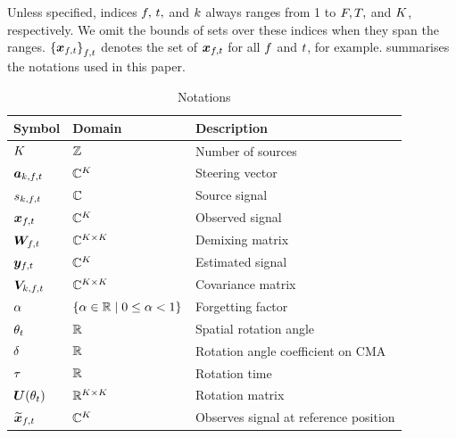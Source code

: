 \documentclass[sip,biber]{now-journal}
\begin{document}
Unless specified, indices $f,\, t,$ and $k$ always ranges from 1 to $F, T,$ and $K$, respectively.
We omit the bounds of sets over these indices when they span the ranges.
${\{\Obs _{\ft}\}}_{\ft}$ denotes the set of $\Obs _{\ft}$ for all $f$ and $t$, for example.
 summarises the notations used in this paper.
\begin{table}[t]
  \centering
  \caption{Notations}\label{tab:notations}
  \begin{tabular}{lll}
    \toprule
      Symbol & Domain & Description \\
    \midrule
      $K$                               & $\mathbb{Z}$                     & Number of sources \\
      $\steer _{\src,\ft}$                 & $\mathbb{C} ^{K}$             & Steering vector \\
      $\sig _{\src,\ft}$                   & $\mathbb{C}$                     & Source signal \\
      $\Obs _{\ft}$                        & $\mathbb{C}^{K}$              & Observed signal \\
      $\Demix _{\ft}$                      & $\mathbb{C}^{K \times K}$  & Demixing matrix \\
      $\Est _{\ft}$                        & $\mathbb{C}^{K}$              & Estimated signal \\
      $\cov _{\src,\ft}$                   & $\mathbb{C}^{K \times K}$  & Covariance matrix \\
      $\alpha$                            & $\{\alpha \in \mathbb{R} \mid 0 \leq \alpha < 1\}$   & Forgetting factor \\
      $\theta _{t}$                & $\mathbb{R}$                     & Spatial rotation angle \\
      $\delta$                           & $\mathbb{R}$                     & Rotation angle coefficient on CMA \\
      $\tau$                            & $\mathbb{R}$                     & Rotation time \\
      $\bm{U} (\theta _{t})$      & $\mathbb{R} ^{K \times K}$ & Rotation matrix \\
      $\refpos{\Obs} _{\ft}$ & $\mathbb{C}^{K}$ & Observes signal at reference position \\
    \bottomrule
  \end{tabular}
\end{table}
\end{document}
